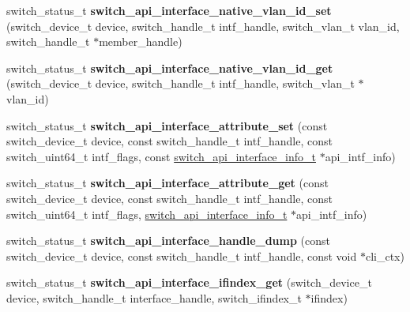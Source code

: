 \begin{DoxyCompactItemize}
\item 
\hypertarget{group__Interface_gabe2f50407ee46c4f7a8118e7f9250585}{switch\+\_\+status\+\_\+t {\bfseries switch\+\_\+api\+\_\+interface\+\_\+native\+\_\+vlan\+\_\+id\+\_\+set} (switch\+\_\+device\+\_\+t device, switch\+\_\+handle\+\_\+t intf\+\_\+handle, switch\+\_\+vlan\+\_\+t vlan\+\_\+id, switch\+\_\+handle\+\_\+t $\ast$member\+\_\+handle)}\label{group__Interface_gabe2f50407ee46c4f7a8118e7f9250585}

\item 
\hypertarget{group__Interface_ga1e7f76e2e2eef0b909b7e838fd4be16e}{switch\+\_\+status\+\_\+t {\bfseries switch\+\_\+api\+\_\+interface\+\_\+native\+\_\+vlan\+\_\+id\+\_\+get} (switch\+\_\+device\+\_\+t device, switch\+\_\+handle\+\_\+t intf\+\_\+handle, switch\+\_\+vlan\+\_\+t $\ast$vlan\+\_\+id)}\label{group__Interface_ga1e7f76e2e2eef0b909b7e838fd4be16e}

\item 
\hypertarget{group__Interface_ga7499047afdee8766b5d8f1c99dbc6458}{switch\+\_\+status\+\_\+t {\bfseries switch\+\_\+api\+\_\+interface\+\_\+attribute\+\_\+set} (const switch\+\_\+device\+\_\+t device, const switch\+\_\+handle\+\_\+t intf\+\_\+handle, const switch\+\_\+uint64\+\_\+t intf\+\_\+flags, const \hyperlink{group__Interface_gac12fe27937cc35580197d25bf616c5d3}{switch\+\_\+api\+\_\+interface\+\_\+info\+\_\+t} $\ast$api\+\_\+intf\+\_\+info)}\label{group__Interface_ga7499047afdee8766b5d8f1c99dbc6458}

\item 
\hypertarget{group__Interface_ga799a116eb20d058b07cbf890cc392d65}{switch\+\_\+status\+\_\+t {\bfseries switch\+\_\+api\+\_\+interface\+\_\+attribute\+\_\+get} (const switch\+\_\+device\+\_\+t device, const switch\+\_\+handle\+\_\+t intf\+\_\+handle, const switch\+\_\+uint64\+\_\+t intf\+\_\+flags, \hyperlink{group__Interface_gac12fe27937cc35580197d25bf616c5d3}{switch\+\_\+api\+\_\+interface\+\_\+info\+\_\+t} $\ast$api\+\_\+intf\+\_\+info)}\label{group__Interface_ga799a116eb20d058b07cbf890cc392d65}

\item 
\hypertarget{group__Interface_gabcf442909062c22602d132d3c7c0582a}{switch\+\_\+status\+\_\+t {\bfseries switch\+\_\+api\+\_\+interface\+\_\+handle\+\_\+dump} (const switch\+\_\+device\+\_\+t device, const switch\+\_\+handle\+\_\+t intf\+\_\+handle, const void $\ast$cli\+\_\+ctx)}\label{group__Interface_gabcf442909062c22602d132d3c7c0582a}

\item 
\hypertarget{group__Interface_gad935b5ca8779e8c07481077726475f7d}{switch\+\_\+status\+\_\+t {\bfseries switch\+\_\+api\+\_\+interface\+\_\+ifindex\+\_\+get} (switch\+\_\+device\+\_\+t device, switch\+\_\+handle\+\_\+t interface\+\_\+handle, switch\+\_\+ifindex\+\_\+t $\ast$ifindex)}\label{group__Interface_gad935b5ca8779e8c07481077726475f7d}


\end{DoxyCompactItemize}
